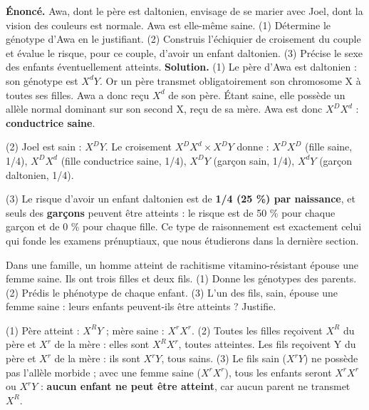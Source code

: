 \documentclass[11pt]{article}
\begin{document}
\begin{exoresolu}
\textbf{Énoncé.} Awa, dont le père est daltonien, envisage de se marier avec Joel, dont la vision des couleurs est normale. Awa est elle-même saine. (1) Détermine le génotype d'Awa en le justifiant. (2) Construis l'échiquier de croisement du couple et évalue le risque, pour ce couple, d'avoir un enfant daltonien. (3) Précise le sexe des enfants éventuellement atteints.
\tcblower
\textbf{Solution.} (1) Le père d'Awa est daltonien : son génotype est $X^{d}Y$. Or un père transmet obligatoirement son chromosome X à toutes ses filles. Awa a donc reçu $X^{d}$ de son père. Étant saine, elle possède un allèle normal dominant sur son second X, reçu de sa mère. Awa est donc $X^{D}X^{d}$ : \textbf{conductrice saine}.

(2) Joel est sain : $X^{D}Y$. Le croisement $X^{D}X^{d} \times X^{D}Y$ donne : $X^{D}X^{D}$ (fille saine, 1/4), $X^{D}X^{d}$ (fille conductrice saine, 1/4), $X^{D}Y$ (garçon sain, 1/4), $X^{d}Y$ (garçon daltonien, 1/4).

(3) Le risque d'avoir un enfant daltonien est de \textbf{1/4 (25 \%) par naissance}, et seuls des \textbf{garçons} peuvent être atteints : le risque est de 50 \% pour chaque garçon et de 0 \% pour chaque fille. Ce type de raisonnement est exactement celui qui fonde les examens prénuptiaux, que nous étudierons dans la dernière section.
\end{exoresolu}

\begin{exercice}
Dans une famille, un homme atteint de rachitisme vitamino-résistant épouse une femme saine. Ils ont trois filles et deux fils. (1) Donne les génotypes des parents. (2) Prédis le phénotype de chaque enfant. (3) L'un des fils, sain, épouse une femme saine : leurs enfants peuvent-ils être atteints ? Justifie.
\end{exercice}

\begin{corrige}
(1) Père atteint : $X^{R}Y$ ; mère saine : $X^{r}X^{r}$. (2) Toutes les filles reçoivent $X^{R}$ du père et $X^{r}$ de la mère : elles sont $X^{R}X^{r}$, toutes atteintes. Les fils reçoivent Y du père et $X^{r}$ de la mère : ils sont $X^{r}Y$, tous sains. (3) Le fils sain ($X^{r}Y$) ne possède pas l'allèle morbide ; avec une femme saine ($X^{r}X^{r}$), tous les enfants seront $X^{r}X^{r}$ ou $X^{r}Y$ : \textbf{aucun enfant ne peut être atteint}, car aucun parent ne transmet $X^{R}$.
\end{corrige}
\end{document}
